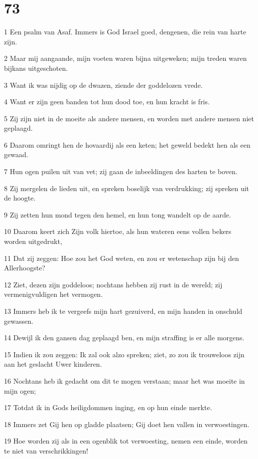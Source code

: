 \chapter{73}

\par 1 Een psalm van Asaf. Immers is God Israel goed, dengenen, die rein van harte zijn.
\par 2 Maar mij aangaande, mijn voeten waren bijna uitgeweken; mijn treden waren bijkans uitgeschoten.
\par 3 Want ik was nijdig op de dwazen, ziende der goddelozen vrede.
\par 4 Want er zijn geen banden tot hun dood toe, en hun kracht is fris.
\par 5 Zij zijn niet in de moeite als andere mensen, en worden met andere mensen niet geplaagd.
\par 6 Daarom omringt hen de hovaardij als een keten; het geweld bedekt hen als een gewaad.
\par 7 Hun ogen puilen uit van vet; zij gaan de inbeeldingen des harten te boven.
\par 8 Zij mergelen de lieden uit, en spreken boselijk van verdrukking; zij spreken uit de hoogte.
\par 9 Zij zetten hun mond tegen den hemel, en hun tong wandelt op de aarde.
\par 10 Daarom keert zich Zijn volk hiertoe, als hun wateren eens vollen bekers worden uitgedrukt,
\par 11 Dat zij zeggen: Hoe zou het God weten, en zou er wetenschap zijn bij den Allerhoogste?
\par 12 Ziet, dezen zijn goddeloos; nochtans hebben zij rust in de wereld; zij vermenigvuldigen het vermogen.
\par 13 Immers heb ik te vergeefs mijn hart gezuiverd, en mijn handen in onschuld gewassen.
\par 14 Dewijl ik den gansen dag geplaagd ben, en mijn straffing is er alle morgens.
\par 15 Indien ik zou zeggen: Ik zal ook alzo spreken; ziet, zo zou ik trouweloos zijn aan het geslacht Uwer kinderen.
\par 16 Nochtans heb ik gedacht om dit te mogen verstaan; maar het was moeite in mijn ogen;
\par 17 Totdat ik in Gods heiligdommen inging, en op hun einde merkte.
\par 18 Immers zet Gij hen op gladde plaatsen; Gij doet hen vallen in verwoestingen.
\par 19 Hoe worden zij als in een ogenblik tot verwoesting, nemen een einde, worden te niet van verschrikkingen!
